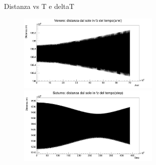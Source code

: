         \begin{frame}{Distanza vs T e deltaT}
            \begin{figure}
                \centering
                \includegraphics[width=\textwidth, height=3.75cm]{5_distanza/ven_8000_drift.jpg}\\
                \includegraphics[width=\linewidth, height=3.75cm]{5_distanza/sat_moto_afe_bug_50k_3600.jpg}
                \label{fig:8000}
            \end{figure}
        \end{frame}
